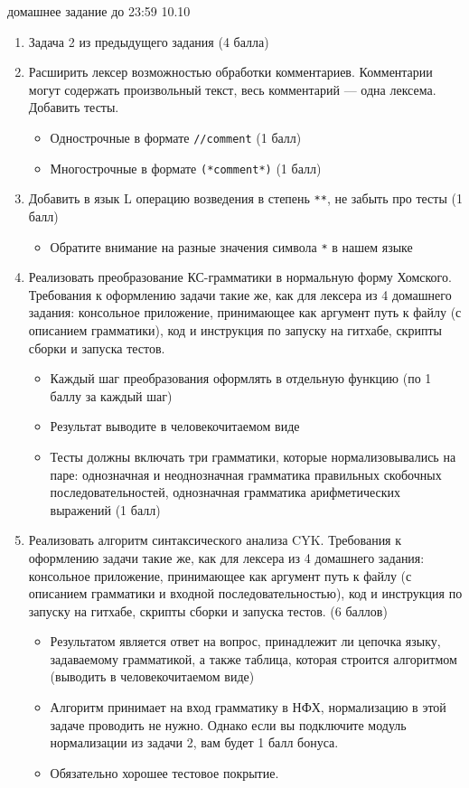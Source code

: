 \documentclass[12pt]{article}
\begin{document}

{\Large домашнее задание до 23:59 10.10}
\bigskip

\begin{enumerate}
  \item Задача 2 из предыдущего задания (4 балла)  
  \item Расширить лексер возможностью обработки комментариев. Комментарии могут содержать произвольный текст, весь комментарий --- одна лексема. Добавить тесты. 
  \begin{itemize}
      \item Однострочные в формате \verb!//comment! (1 балл)
      \item Многострочные в формате \verb!(*comment*)! (1 балл)
  \end{itemize}
  \item Добавить в язык L операцию возведения в степень \verb!**!, не забыть про тесты (1 балл)
  \begin{itemize}
      \item Обратите внимание на разные значения символа \verb!*! в нашем языке
  \end{itemize}
    
  \item Реализовать преобразование КС-грамматики в нормальную форму Хомского. Требования к оформлению задачи такие же, как для лексера из 4 домашнего задания: консольное приложение, принимающее как аргумент путь к файлу (с описанием грамматики), код и инструкция по запуску на гитхабе, скрипты сборки и запуска тестов.
  \begin{itemize}
      \item Каждый шаг преобразования оформлять в отдельную функцию (по 1 баллу за каждый шаг)
      \item Результат выводите в человекочитаемом виде
      \item Тесты должны включать три грамматики, которые нормализовывались на паре: однозначная и неоднозначная грамматика правильных скобочных последовательностей, однозначная грамматика арифметических выражений (1 балл)
  \end{itemize}
  \item Реализовать алгоритм синтаксического анализа CYK. Требования к оформлению задачи такие же, как для лексера из 4 домашнего задания: консольное приложение, принимающее как аргумент путь к файлу (с описанием грамматики и входной последовательностью), код и инструкция по запуску на гитхабе, скрипты сборки и запуска тестов. (6 баллов)
  \begin{itemize}
      \item Результатом является ответ на вопрос, принадлежит ли цепочка языку, задаваемому грамматикой, а также таблица, которая строится алгоритмом (выводить в человекочитаемом виде)
      \item Алгоритм принимает на вход грамматику в НФХ, нормализацию в этой задаче проводить не нужно. Однако если вы подключите модуль нормализации из задачи 2, вам будет 1 балл бонуса. 
      \item Обязательно хорошее тестовое покрытие. 
  \end{itemize}
  
\end{enumerate}

\end{document}

